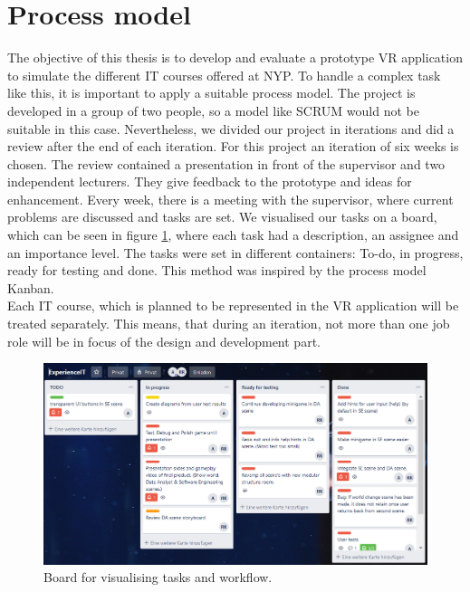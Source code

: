\section{Process model}
The objective of this thesis is to develop and evaluate a prototype VR application to simulate the different IT courses offered at NYP. To handle a complex task like this, it is important to apply a suitable process model. The project is developed in a group of two people, so a model like SCRUM would not be suitable in this case. Nevertheless, we divided our project in iterations and did a review after the end of each iteration. For this project an iteration of six weeks is chosen. The review contained a presentation in front of the supervisor and two independent lecturers. They give feedback to the prototype and ideas for enhancement. Every week, there is a meeting with the supervisor, where current problems are discussed and tasks are set. We visualised our tasks on a board, which can be seen in  figure \ref{fig:board}, where each task had a description, an assignee and an importance level. The tasks were set in different containers: To-do, in progress, ready for testing and done. This method was inspired by the process model Kanban.\\
Each IT course, which is planned to be represented in the VR application will be treated separately. This means, that during an iteration, not more than one job role will be in focus of the design and development part.  
\begin{figure}[h!]
  \includegraphics[width=16cm]{kapitel/kanban-board.png}
  \centering
  \caption{Board for visualising tasks and workflow.}
  \label{fig:board}
\end{figure}
\newpage
